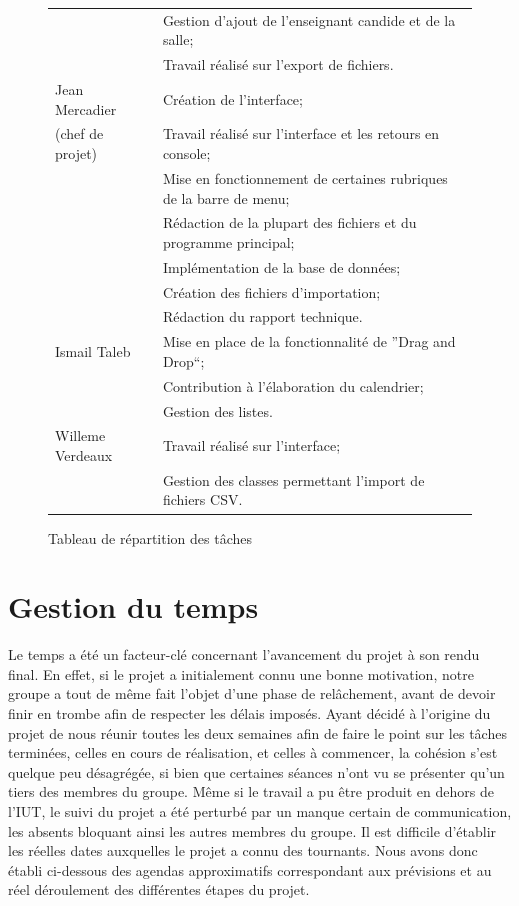 \documentclass[a4paper,10pt]{report}
\begin{document}
\begin{figure}[H]
{\begin{tabular}{|l|l|}
	      & Gestion d'ajout de l'enseignant candide et de la salle;\\
	      & Travail réalisé sur l'export de fichiers.\\
	      \hline
	      Jean Mercadier
	      & Création de l'interface; \\
	      (chef de projet)& Travail réalisé sur l'interface et les retours en console;\\
	      & Mise en fonctionnement de certaines rubriques de la barre de menu;\\
	      & Rédaction de la plupart des fichiers et du programme principal;\\
	      & Implémentation de la base de données;\\
	      & Création des fichiers d'importation;\\
	      & Rédaction du rapport technique.\\
	      \hline
	      Ismail Taleb 
	      & Mise en place de la fonctionnalité de ''Drag and Drop``; \\
	      & Contribution à l'élaboration du calendrier;\\
	      & Gestion des listes.\\
	      \hline
	      Willeme Verdeaux 
	      & Travail réalisé sur l'interface; \\
	      & Gestion des classes permettant l'import de fichiers CSV.\\
	    \hline
	  \end{tabular}
	  \hss}
	  \caption{Tableau de répartition des tâches}
      \end{figure}
      
      
  \chapter{Gestion du temps}
    Le temps a été un facteur-clé concernant l'avancement du projet à son rendu final.
    En effet, si le projet a initialement connu une bonne motivation, notre groupe a tout de même fait l'objet d'une phase de relâchement, avant de devoir finir en trombe afin de respecter les délais imposés.
    Ayant décidé à l'origine du projet de nous réunir toutes les deux semaines afin de faire le point sur les tâches terminées, celles en cours de réalisation, et celles à commencer, la cohésion s'est quelque peu désagrégée, si bien que certaines séances n'ont vu se présenter qu'un tiers des membres du groupe.
    Même si le travail a pu être produit en dehors de l'IUT, le suivi du projet a été perturbé par un manque certain de communication, les absents bloquant ainsi les autres membres du groupe.
    Il est difficile d'établir les réelles dates auxquelles le projet a connu des tournants.
    Nous avons donc établi ci-dessous des agendas approximatifs correspondant aux prévisions et au réel déroulement des différentes étapes du projet.
    
\end{document}
